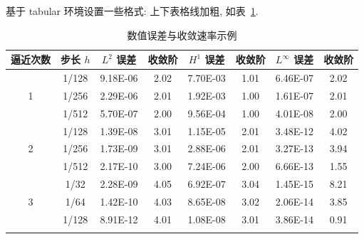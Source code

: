 \documentclass[UTF8,openany]{ctexbook}
\numberwithin{equation}{chapter}
\numberwithin{figure}{chapter}
\numberwithin{table}{chapter}
\theoremstyle{mystyle}
\begin{document}
\clearpage
基于 tabular 环境设置一些格式: 上下表格线加粗, 如表~\ref{tab:error}.
\begin{table}[htp!]
\centering
\caption{数值误差与收敛速率示例}
\label{tab:error}
\begin{tabular}{c|c|cc|cc|cc}
\Xhline{2\arrayrulewidth}
逼近次数 & 步长 $h$ & $L^2$ 误差 & 收敛阶 & $H^1$ 误差 & 收敛阶 & $L^\infty$ 误差 & 收敛阶 \\
\hline
  & 1/128 & 9.18E-06 & 2.02 & 7.70E-03 & 1.01  & 6.46E-07 & 2.02 \\
1 & 1/256 & 2.29E-06 & 2.01 & 1.92E-03 & 1.00  & 1.61E-07 & 2.01 \\
  & 1/512 & 5.70E-07 & 2.00 & 9.56E-04 & 1.00  & 4.01E-08 & 2.00 \\
\hline
  & 1/128 & 1.39E-08 & 3.01 & 1.15E-05 & 2.01  & 3.48E-12 & 4.02 \\
2 & 1/256 & 1.73E-09 & 3.01 & 2.88E-06 & 2.01  & 3.27E-13 & 3.94 \\
  & 1/512 & 2.17E-10 & 3.00 & 7.24E-06 & 2.00  & 6.66E-13 & 1.55 \\
\hline
  & 1/32  & 2.28E-09 & 4.05 & 6.92E-07 & 3.04  & 1.45E-15 & 8.21 \\
3 & 1/64  & 1.42E-10 & 4.03 & 8.65E-08 & 3.02  & 2.06E-14 & 3.85 \\
  & 1/128 & 8.91E-12 & 4.01 & 1.08E-08 & 3.01  & 3.86E-14 & 0.91 \\
\Xhline{2\arrayrulewidth}
\end{tabular}
\end{table}




\clearpage
{}
{}




\end{document}
